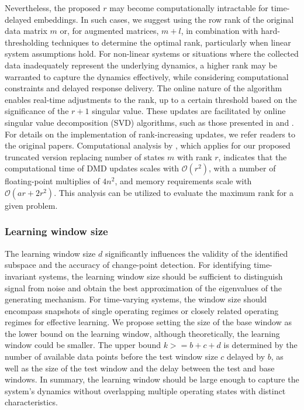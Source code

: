 Nevertheless, the proposed \( r \) may become computationally intractable for time-delayed embeddings. In such cases, we suggest using the row rank of the original data matrix \( m \) or, for augmented matrices, \( m + l \), in combination with hard-thresholding techniques to determine the optimal rank, particularly when linear system assumptions hold. For non-linear systems or situations where the collected data inadequately represent the underlying dynamics, a higher rank may be warranted to capture the dynamics effectively, while considering computational constraints and delayed response delivery. The online nature of the algorithm enables real-time adjustments to the rank, up to a certain threshold based on the significance of the \(r + 1\) singular value. These updates are facilitated by online singular value decomposition (SVD) algorithms, such as those presented in \citet{Brand2006} and \citet{Zhang2022}. For details on the implementation of rank-increasing updates, we refer readers to the original papers. Computational analysis by \citet{Zhang2019}, which applies for our proposed truncated version replacing number of states \(m\) with rank \(r\), indicates that the computational time of DMD updates scales with \( \mathcal{O}(r^2) \), with a number of floating-point multiplies of \(4n^2\), and memory requirements scale with \( \mathcal{O}(a r + 2 r ^ 2) \). This analysis can be utilized to evaluate the maximum rank for a given problem.

\subsubsection{Learning window size}
The learning window size \(d\) significantly influences the validity of the identified subspace and the accuracy of change-point detection. For identifying time-invariant systems, the learning window size should be sufficient to distinguish signal from noise and obtain the best approximation of the eigenvalues of the generating mechanism. For time-varying systems, the window size should encompass snapshots of single operating regimes or closely related operating regimes for effective learning. We propose setting the size of the base window as the lower bound on the learning window, although theoretically, the learning window could be smaller. The upper bound \(k >= b + c + d\) is determined by the number of available data points before the test window size \(c\) delayed by \(b\), as well as the size of the test window and the delay between the test and base windows. In summary, the learning window should be large enough to capture the system's dynamics without overlapping multiple operating states with distinct characteristics.

